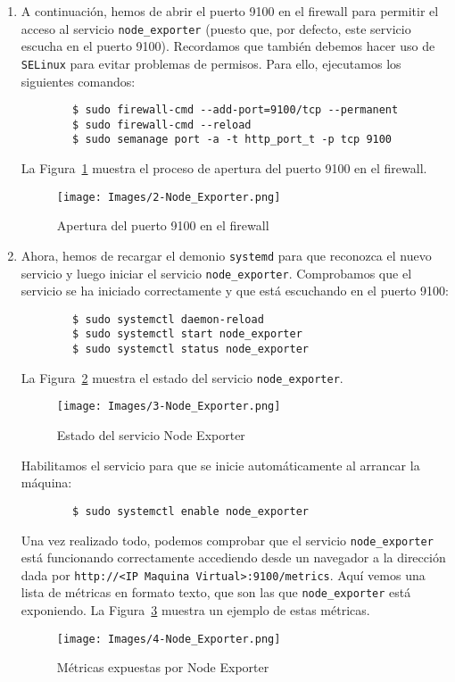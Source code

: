 \documentclass[a4paper,12pt]{article}
\begin{document}
\begin{enumerate}
\begin{verbatim}
    [Install]
    WantedBy=multi-user.target
    \end{verbatim}


    \item A continuación, hemos de abrir el puerto 9100 en el firewall para permitir el acceso al servicio \verb|node_exporter| (puesto que, por defecto, este servicio escucha en el puerto 9100). Recordamos que también debemos hacer uso de \verb|SELinux| para evitar problemas de permisos. Para ello, ejecutamos los siguientes comandos:
    \begin{verbatim}
        $ sudo firewall-cmd --add-port=9100/tcp --permanent
        $ sudo firewall-cmd --reload
        $ sudo semanage port -a -t http_port_t -p tcp 9100
    \end{verbatim}
    La Figura~\ref{fig:2-Node_Exporter} muestra el proceso de apertura del puerto 9100 en el firewall.
    \begin{figure}[h]
        \centering
        \texttt{[image: Images/2-Node\_Exporter.png]}
        \caption{Apertura del puerto 9100 en el firewall}
        \label{fig:2-Node_Exporter}
    \end{figure}

    \item Ahora, hemos de recargar el demonio \verb|systemd| para que reconozca el nuevo servicio y luego iniciar el servicio \verb|node_exporter|. Comprobamos que el servicio se ha iniciado correctamente y que está escuchando en el puerto 9100:
    \begin{verbatim}
        $ sudo systemctl daemon-reload
        $ sudo systemctl start node_exporter
        $ sudo systemctl status node_exporter
    \end{verbatim}
    La Figura~\ref{fig:3-Node_Exporter} muestra el estado del servicio \verb|node_exporter|.
    \begin{figure}[h]
        \centering
        \texttt{[image: Images/3-Node\_Exporter.png]}
        \caption{Estado del servicio Node Exporter}
        \label{fig:3-Node_Exporter}
    \end{figure}
    Habilitamos el servicio para que se inicie automáticamente al arrancar la máquina:
    \begin{verbatim}
        $ sudo systemctl enable node_exporter
    \end{verbatim}

    Una vez realizado todo, podemos comprobar que el servicio \verb|node_exporter| está funcionando correctamente accediendo desde un navegador a la dirección dada por \verb|http://<IP Maquina Virtual>:9100/metrics|. Aquí vemos una lista de métricas en formato texto, que son las que \verb|node_exporter| está exponiendo. La Figura~\ref{fig:4-Node_Exporter} muestra un ejemplo de estas métricas.
    \begin{figure}[h]
        \centering
        \texttt{[image: Images/4-Node\_Exporter.png]}
        \caption{Métricas expuestas por Node Exporter}
        \label{fig:4-Node_Exporter}
    \end{figure}


\end{enumerate}
\end{document}
